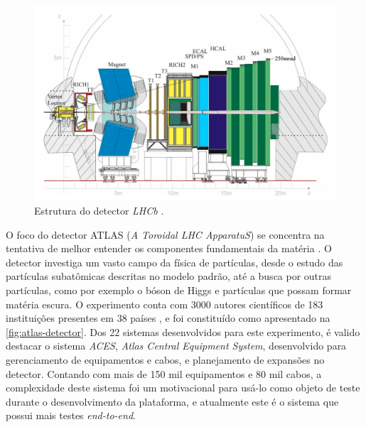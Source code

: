 \begin{figure}[H]
    \centering
    \includegraphics[width=14cm]{source/2-contextualizacao/images/lhcb-detector.png}
    \caption{Estrutura do detector \emph{LHCb} \cite{lhcb}.}
    \label{fig:lhcb-detector}
\end{figure}

O foco do detector ATLAS (\emph{A Toroidal LHC ApparatuS}) se concentra na tentativa de melhor entender os componentes fundamentais da matéria \cite{cernsiteatlas}. O detector investiga um vasto campo da física de partículas, desde o estudo das partículas subatômicas descritas no modelo padrão, até a busca por outras partículas, como por exemplo o bóson de Higgs e partículas que possam formar matéria escura. O experimento conta com 3000 autores científicos de 183 instituições presentes em 38 países \cite{cernsiteabout}, e foi constituído como apresentado na \ref{fig:atlas-detector}. Dos 22 sistemas desenvolvidos para este experimento, é valido destacar o sistema \emph{ACES}, \emph{Atlas Central Equipment System}, desenvolvido para gerenciamento de equipamentos e cabos, e planejamento de expansões no detector. Contando com mais de 150 mil equipamentos e 80 mil cabos, a complexidade deste sistema foi um motivacional para usá-lo como objeto de teste durante o desenvolvimento da plataforma, e atualmente este é o sistema que possui mais testes \emph{end-to-end}.

